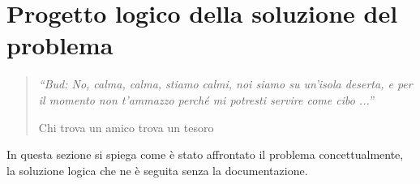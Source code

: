 \chapter{Progetto logico della soluzione del problema}
\label{capitolo4}
\thispagestyle{empty}

\begin{quotation}
{\footnotesize
\noindent \emph{``Bud: No, calma, calma, stiamo calmi, noi siamo su un'isola deserta, e per il momento non t'ammazzo perch\'e mi potresti servire come cibo ...''}
\begin{flushright}
Chi trova un amico trova un tesoro
\end{flushright}
}
\end{quotation}
\vspace{0.5cm}

\noindent In questa sezione si spiega come \`e stato affrontato il problema concettualmente, la soluzione logica che ne \`e seguita senza la documentazione.
